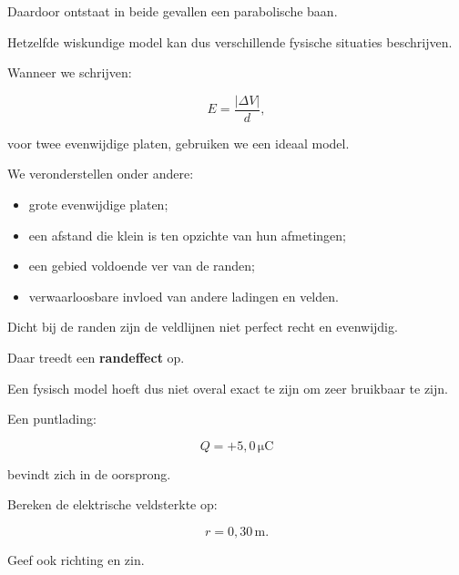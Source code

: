 \documentclass{ximera}
\begin{document}
Daardoor ontstaat in beide gevallen een parabolische baan.

Hetzelfde wiskundige model kan dus verschillende fysische situaties
beschrijven.




Wanneer we schrijven:

\[
E=\frac{|\Delta V|}{d},
\]

voor twee evenwijdige platen, gebruiken we een ideaal model.

We veronderstellen onder andere:

\begin{itemize}
  \item grote evenwijdige platen;
  \item een afstand die klein is ten opzichte van hun afmetingen;
  \item een gebied voldoende ver van de randen;
  \item verwaarloosbare invloed van andere ladingen en velden.
\end{itemize}

Dicht bij de randen zijn de veldlijnen niet perfect recht en
evenwijdig.

Daar treedt een \textbf{randeffect} op.

Een fysisch model hoeft dus niet overal exact te zijn om zeer bruikbaar
te zijn.








\begin{oefening}[Veldsterkte]{\oefB\ESS}

Een puntlading:

\[
Q=+5{,}0\,\mathrm{\mu C}
\]

bevindt zich in de oorsprong.

Bereken de elektrische veldsterkte op:

\[
r=0{,}30\,\mathrm m.
\]

Geef ook richting en zin.

\end{oefening}
\end{document}

